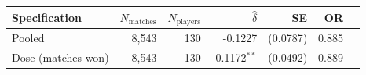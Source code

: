 \begin{tabular}{lrrrrrr}
\toprule
Specification & $N_{\text{matches}}$ & $N_{\text{players}}$ & $\hat{\delta}$ & SE & OR \\
\midrule
Pooled & 8,543 & 130 & -0.1227 & (0.0787) & 0.885 \\
Dose (matches won) & 8,543 & 130 & -0.1172$^{**}$ & (0.0492) & 0.889 \\
\bottomrule
\end{tabular}
